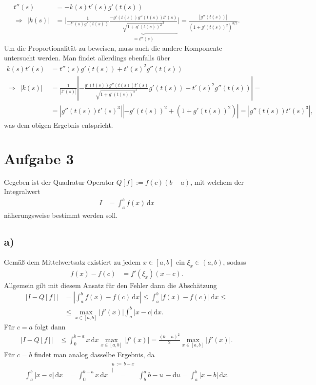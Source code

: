 \documentclass[english, parskip=full]{scrartcl}
\newcommand{\kom}{}
\newcommand{\intx}{}
\newcommand{\kla}{}
\begin{document}
\begin{align}
t''(s)&=-k(s)t'(s)g'(t(s))\\
\Rightarrow\ \ |k(s)|&=\Bigg\vert\frac{1}{-t'(s)g'(t(s))} \underbrace{\frac{-g'(t(s))g''(t(s))t'(s)}{\sqrt{1+g'(t(s))^2}^3}}_{=t''(s)} \Bigg\vert=\frac{|g''(t(s))|}{\kla\left( 1+g'(t(s))^2 \right)^{3/2}}.
\end{align}
Um die Proportionalität zu beweisen, muss auch die andere Komponente untersucht werden.
Man findet allerdings ebenfalls über
\begin{align}
k(s)t'(s)&=t''(s)g'(t(s))+t'(s)^2g''(t(s))\\
\Rightarrow\ \ |k(s)|&=\frac{1}{|t'(s)|}\left\vert  - \frac{g'(t(s))g''(t(s))t'(s)}{\sqrt{1+g'(t(s))^2}^3} g'(t(s))+t'(s)^2g''(t(s)) \right\vert=\\
&=|g''(t(s))t'(s)^3|\left\vert -g'(t(s))^2+\kla\left( 1+g'(t(s))^2 \right)\right\vert=|g''(t(s))t'(s)^3|,
\end{align}
was dem obigen Ergebnis entspricht.
\section*{Aufgabe 3}
Gegeben ist der Quadratur-Operator $Q[f]:=f(c)(b-a)$, mit welchem der Integralwert
\begin{align}
I&=\intx\int_{a}^{b}f(x)\, \mathrm{d}x
\end{align}
näherungsweise bestimmt werden soll.
\subsection*{a)}
Gemäß dem Mittelwertsatz existiert zu jedem $x\in[a,b]$ ein $\xi_x\in (a,b)$, sodass
\begin{align}
f(x)-f(c)&=f'(\xi_x)(x-c).
\end{align}
Allgemein gilt mit diesem Ansatz für den Fehler dann die Abschätzung
\begin{align}
|I-Q[f]|&=\left\vert\intx\int_{a}^{b}f(x)-f(c)\, \mathrm{d}x\right\vert\le\intx\int_{a}^{b}|f(x)-f(c)|\, \mathrm{d}x\le\\
&\le\max_{x\in[a,b]}\left\vert f'(x) \right\vert\intx\int_{a}^{b}|x-c|\, \mathrm{d}x.
\end{align}
Für $c=a$ folgt dann
\begin{align}
|I-Q[f]|&\le\intx\int_{0}^{b-a}x\, \mathrm{d}x \max_{x\in[a,b]}\left\vert f'(x) \right\vert=\frac{(b-a)^2}{2}\max_{x\in[a,b]}\left\vert f'(x) \right\vert.
\end{align}
Für $c=b$ findet man analog dasselbe Ergebnis, da
\begin{align}
\intx\int_{a}^{b}|x-a|\, \mathrm{d}x&=\intx\int_{0}^{b-a}x\, \mathrm{d}x\kom\overset{\substack{{u\,:=\,b-x} \\ |}}{=}\intx\int_{b}^{a}b-u\, -\mathrm{d}u=\intx\int_{a}^{b}|x-b|\, \mathrm{d}x.
\end{align}
\end{document}
